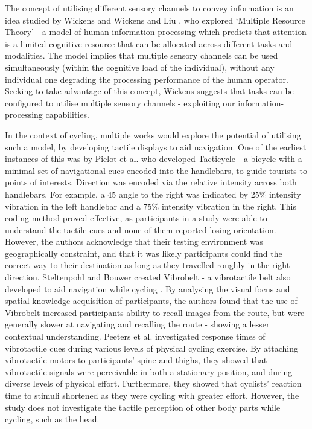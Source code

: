 \documentclass{interim}
\begin{document}
The concept of utilising different sensory channels to convey information is an idea studied by Wickens \cite{wickens1984processing} and Wickens and Liu \cite{doi:10.1177/001872088803000505}, who explored ‘Multiple Resource Theory’ - a model of human information processing which predicts that attention is a limited cognitive resource that can be allocated across different tasks and modalities. The model implies that multiple sensory channels can be used simultaneously (within the cognitive load of the individual), without any individual one degrading the processing performance of the human operator. Seeking to take advantage of this concept, Wickens suggests that tasks can be configured to utilise multiple sensory channels - exploiting our information-processing capabilities.

In the context of cycling, multiple works would explore the potential of utilising such a model, by developing tactile displays to aid navigation. One of the earliest instances of this was by Pielot et al. \cite{10.1145/2371574.2371631} who developed Tacticycle - a bicycle with a minimal set of navigational cues encoded into the handlebars, to guide tourists to points of interests. Direction was encoded via the relative intensity across both handlebars. For example, a 45\degree{} angle to the right was indicated by 25\% intensity vibration in the left handlebar and a 75\% intensity vibration in the right. This coding method proved effective, as participants in a study were able to understand the tactile cues and none of them reported losing orientation. However, the authors acknowledge that their testing environment was geographically constraint, and that it was likely participants could find the correct way to their destination as long as they travelled roughly in the right direction. Steltenpohl and Bouwer \cite{10.1145/2449396.2449450} created Vibrobelt - a vibrotactile belt also developed to aid navigation while cycling . By analysing the visual focus and spatial knowledge acquisition of participants, the authors found that the use of Vibrobelt increased participants ability to recall images from the route, but were generally slower at navigating and recalling the route - showing a lesser contextual understanding. Peeters et al. \cite{peeters2019vibrotactile} investigated response times of vibrotactile cues during various levels of physical cycling exercise. By attaching vibrotactile motors to participants' spine and thighs, they showed that vibrotactile signals were perceivable in both a stationary position, and during diverse levels of physical effort. Furthermore, they showed that cyclists' reaction time to stimuli shortened as they were cycling with greater effort. However, the study does not investigate the tactile perception of other body parts while cycling, such as the head.
\end{document}
